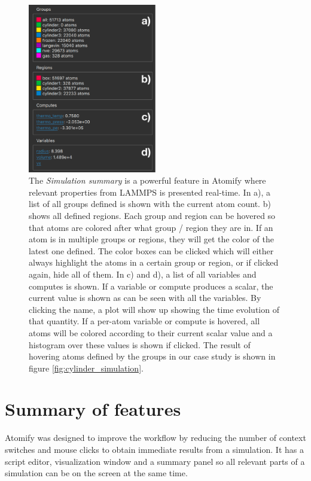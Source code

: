 \documentclass[12pt,a4paper,final]{iopart}
\begin{document}
\begin{figure}[htp!]
	\centering
	\includegraphics[width=0.5\textwidth]{figures/rightbar.pdf}
	\caption{
		The \textit{Simulation summary} is a powerful feature in Atomify where relevant
		properties from LAMMPS is presented real-time.
		In a), a list of all groups defined is shown with the current atom count.
		b) shows all defined regions. Each group and region can be hovered so that atoms
		are colored after what group / region they are in. If an atom is in multiple
		groups or regions, they will get the color of the latest one defined.
		The color boxes can be clicked which will either always highlight the atoms in a certain group or region,
		or if clicked again, hide all of them.
		In c) and d), a list of all variables and computes is shown. If a variable or compute
		produces a scalar, the current value is shown as can be seen with all the variables.
		By clicking the name, a plot will show up showing the time evolution of that quantity.
		If a per-atom variable or compute is hovered, all atoms will be colored according to their
		current scalar value and a histogram over these values is shown if clicked.
		The result of hovering atoms defined by the groups in our case study is shown in figure \ref{fig:cylinder_simulation}.
    }
	\label{fig:rightbar}
\end{figure}

\section{\label{sec:features}Summary of features}
Atomify was designed to improve the workflow by reducing the number of
context switches and mouse clicks to obtain immediate results from a simulation.
It has a script editor, visualization window and a summary panel so all relevant parts
of a simulation can be on the screen at the same time.
\end{document}
